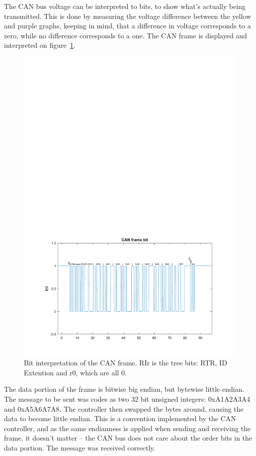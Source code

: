 The CAN bus voltage can be interpreted to bits, to show what's actually being transmitted.
This is done by measuring the voltage difference between the yellow and purple graphs, keeping in mind, that a difference in voltage corresponds to a zero, while no difference corresponds to a one.
The CAN frame is displayed and interpreted on figure~\ref{fig:CAN_test1_message}.

\begin{figure}[h]
	\centering
	\includegraphics[width = \linewidth]{graphics/CAN_test1_message}
	\caption{Bit interpretation of the CAN frame. RIr  is the tree bits: RTR, ID Extention and r0, which are all 0.}
	\label{fig:CAN_test1_message}
\end{figure}

The data portion of the frame is bitwise big endian, but bytewise little endian. 
The message to be sent was codes as two 32 bit unsigned integers: 0xA1A2A3A4 and 0xA5A6A7A8.
The controller then swapped the bytes around, causing the data to become little endian.
This is a convention implemented by the CAN controller, and as the same endianness is applied when sending and receiving the frame, it doesn't matter -- the CAN bus does not care about the order bits in the data portion. 
The message was received correctly.\\

